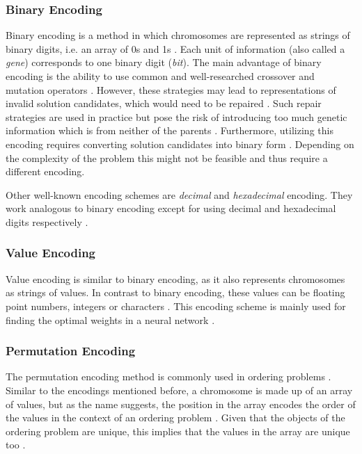 \documentclass[sigconf]{acmart}
\begin{document}
\subsubsection{Binary Encoding}
Binary encoding is a method in which chromosomes are represented as strings
of binary digits, i.e. an array of 0s and 1s \cite{Katoch2021}.
Each unit of information (also called a \textit{gene}) corresponds to one binary
digit (\textit{bit}).
%
The main advantage of binary encoding is the ability to use common and
well-researched crossover and mutation operators \cite{Katoch2021}.
However, these strategies may lead to representations of invalid solution
candidates, which would need to be repaired \cite{Beligiannis2009}.
Such repair strategies are used in practice but pose the risk of introducing
too much genetic information which is from neither of the parents
\cite{Affenzeller2009,Beligiannis2009}.
%
Furthermore, utilizing this encoding requires converting solution candidates
into binary form \cite{Katoch2021}. Depending on the complexity of the problem
this might not be feasible and thus require a different encoding.

Other well-known encoding schemes are \textit{decimal} and \textit{hexadecimal}
encoding. They work analogous to binary encoding except for using decimal and
hexadecimal digits respectively \cite{Katoch2021}.

\subsubsection{Value Encoding}
Value encoding is similar to binary encoding, as it also represents chromosomes
as strings of values. In contrast to binary encoding, these values can be
floating point numbers, integers or characters \cite{Katoch2021}.
This encoding scheme is mainly used for finding the optimal weights in a
neural network \cite{Katoch2021}.

\subsubsection{Permutation Encoding}
The permutation encoding method is commonly used in ordering problems
\cite{Katoch2021}. Similar to the encodings mentioned before, a chromosome
is made up of an array of values, but as the name suggests, the position in
the array encodes the order of the values in the context of an ordering problem
\cite{Katoch2021,Affenzeller2009}. Given that the objects of the ordering
problem are unique, this implies that the values in the array are unique too
\cite{Affenzeller2009}.
\end{document}
